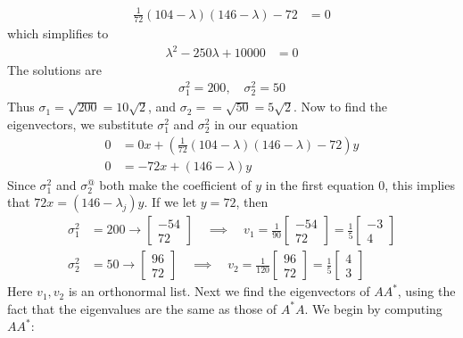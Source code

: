\documentclass[12pt]{article}
\newenvironment{sol}[1][Solution]{\begin{trivlist}
		\item[\hskip \labelsep {\bfseries #1:}]}{\end{trivlist}}
\begin{document}
\begin{sol}
\begin{enumerate}[label=(\alph*)]
		\begin{align*}
			\frac{1}{72}(104-\lambda)(146-\lambda)-72&=0
		\end{align*}
		which simplifies to
		\begin{align*}
			\lambda^2-250\lambda +10000&=0
		\end{align*}
		The solutions are
		\begin{align*}
			\sigma_{1}^2 = 200,\quad \sigma_2^2 = 50
		\end{align*}
		Thus $\sigma_1 =\sqrt{200}=10\sqrt{2}$, and $\sigma_2==\sqrt{50}=5\sqrt{2}$.
		Now to find the eigenvectors, we substitute $\sigma_1^2$ and $\sigma_2^2$ in our equation
		\begin{align*}
			0 &= 0x +\left(\frac{1}{72}(104-\lambda)(146-\lambda)-72\right)y \\
			0 &= -72x + (146-\lambda)y
		\end{align*}
		Since $\sigma_1^2$ and $\sigma_2^@$ both make the coefficient of $y$ in the first equation 0,
		this implies that $72x=(146-\lambda_j)y$. If we let $y=72$, then
		\begin{align*}
			\sigma_1^2&=200\to \begin{bmatrix}
				-54\\
				72
			\end{bmatrix}
			\quad\implies\quad v_1=\frac{1}{90}
			\begin{bmatrix}
				-54\\
				72
			\end{bmatrix}
			=\frac{1}{5}\begin{bmatrix}
				-3\\
				4
			\end{bmatrix}
			\\
			\sigma_2^2&=50\to
			\begin{bmatrix}
				96\\
				72
			\end{bmatrix}
			\quad \implies\quad 
			v_2=
			\frac{1}{120}
			\begin{bmatrix}
				96\\
				72
			\end{bmatrix}
			=\frac{1}{5}\begin{bmatrix}
				4 \\
				3
			\end{bmatrix}
		\end{align*}
		Here $v_1,v_2$ is an orthonormal list. Next we find the eigenvectors of $AA^*$, using the fact that
		the eigenvalues are the same as those of $A^*A$. We begin by computing $AA^*$:

\end{enumerate}
\end{sol}
\end{document}
